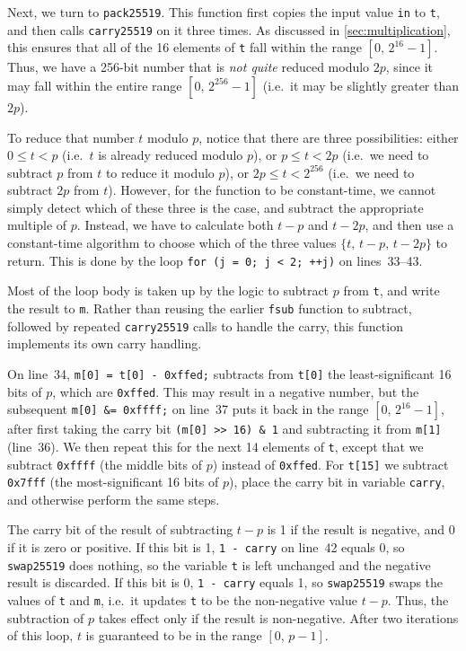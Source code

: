 \documentclass[manuscript]{acmart}
\begin{document}
Next, we turn to \verb|pack25519|.
This function first copies the input value \verb|in| to \verb|t|, and then calls \verb|carry25519| on it three times.
As discussed in \autoref{sec:multiplication}, this ensures that all of the 16 elements of \verb|t| fall within the range $[0,\, 2^{16}-1]$.
Thus, we have a 256-bit number that is \emph{not quite} reduced modulo $2p$, since it may fall within the entire range $[0,\, 2^{256}-1]$ (i.e.\ it may be slightly greater than $2p$).

To reduce that number $t$ modulo $p$, notice that there are three possibilities: either $0 \le t < p$ (i.e.\ $t$ is already reduced modulo $p$), or $p \le t < 2p$ (i.e.\ we need to subtract $p$ from $t$ to reduce it modulo $p$), or $2p \le t < 2^{256}$ (i.e.\ we need to subtract $2p$ from $t$).
However, for the function to be constant-time, we cannot simply detect which of these three is the case, and subtract the appropriate multiple of $p$.
Instead, we have to calculate both $t-p$ and $t-2p$, and then use a constant-time algorithm to choose which of the three values $\{t,\, t-p,\, t-2p\}$ to return.
This is done by the loop \verb|for (j = 0; j < 2; ++j)| on lines~33--43.

Most of the loop body is taken up by the logic to subtract $p$ from \verb|t|, and write the result to \verb|m|.
Rather than reusing the earlier \verb|fsub| function to subtract, followed by repeated \verb|carry25519| calls to handle the carry, this function implements its own carry handling.

On line~34, \verb|m[0] = t[0] - 0xffed;| subtracts from \verb|t[0]| the least-significant 16 bits of $p$, which are \verb|0xffed|.
This may result in a negative number, but the subsequent \verb|m[0] &= 0xffff;| on line~37 puts it back in the range $[0,\, 2^{16}-1]$, after first taking the carry bit \verb|(m[0] >> 16) & 1| and subtracting it from \verb|m[1]| (line~36).
We then repeat this for the next 14 elements of \verb|t|, except that we subtract \verb|0xffff| (the middle bits of $p$) instead of \verb|0xffed|.
For \verb|t[15]| we subtract \verb|0x7fff| (the most-significant 16 bits of $p$), place the carry bit in variable \verb|carry|, and otherwise perform the same steps.

The carry bit of the result of subtracting $t-p$ is 1 if the result is negative, and 0 if it is zero or positive.
If this bit is 1, \verb|1 - carry| on line~42 equals 0, so \verb|swap25519| does nothing, so the variable \verb|t| is left unchanged and the negative result is discarded.
If this bit is 0, \verb|1 - carry| equals 1, so \verb|swap25519| swaps the values of \verb|t| and \verb|m|, i.e.\ it updates \verb|t| to be the non-negative value $t-p$.
Thus, the subtraction of $p$ takes effect only if the result is non-negative.
After two iterations of this loop, $t$ is guaranteed to be in the range $[0,\, p-1]$.
\end{document}
